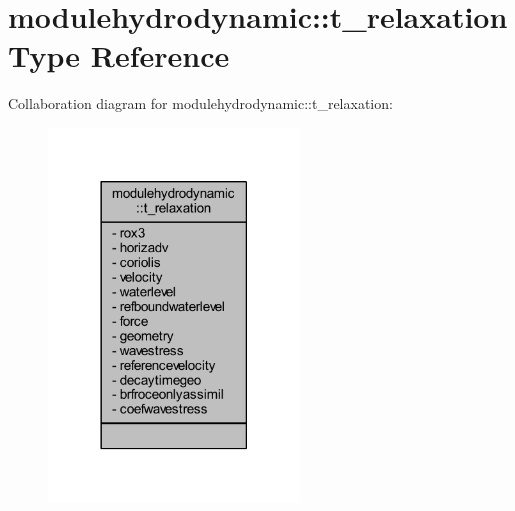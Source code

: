\hypertarget{structmodulehydrodynamic_1_1t__relaxation}{}\section{modulehydrodynamic\+:\+:t\+\_\+relaxation Type Reference}
\label{structmodulehydrodynamic_1_1t__relaxation}


Collaboration diagram for modulehydrodynamic\+:\+:t\+\_\+relaxation\+:\nopagebreak
\begin{figure}[H]
\begin{center}
\leavevmode
\includegraphics[width=189pt]{structmodulehydrodynamic_1_1t__relaxation__coll__graph}
\end{center}
\end{figure}
